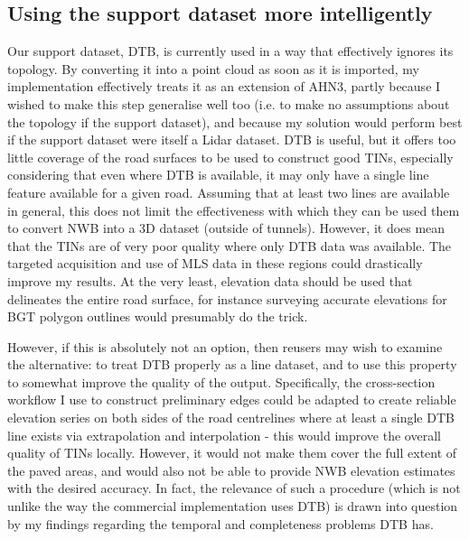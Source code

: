\subsection{Using the support dataset more intelligently}
\label{sub:improvementssupportdataset}

Our support dataset, DTB, is currently used in a way that effectively ignores its topology. By converting it into a point cloud as soon as it is imported, my implementation effectively treats it as an extension of AHN3, partly because I wished to make this step generalise well too (i.e. to make no assumptions about the topology if the support dataset), and because my solution would perform best if the support dataset were itself a Lidar dataset. DTB is useful, but it offers too little coverage of the road surfaces to be used to construct good TINs, especially considering that even where DTB is available, it may only have a single line feature available for a given road. Assuming that at least two lines are available in general, this does not limit the effectiveness with which they can be used them to convert NWB into a 3D dataset (outside of tunnels). However, it does mean that the TINs are of very poor quality where only DTB data was available. The targeted acquisition and use of MLS data in these regions could drastically improve my results. At the very least, elevation data should be used that delineates the entire road surface, for instance surveying accurate elevations for BGT polygon outlines would presumably do the trick.

However, if this is absolutely not an option, then reusers may wish to examine the alternative: to treat DTB properly as a line dataset, and to use this property to somewhat improve the quality of the output. Specifically, the cross-section workflow I use to construct preliminary edges could be adapted to create reliable elevation series on both sides of the road centrelines where at least a single DTB line exists via extrapolation and interpolation - this would improve the overall quality of TINs locally. However, it would not make them cover the full extent of the paved areas, and would also not be able to provide NWB elevation estimates with the desired accuracy. In fact, the relevance of such a procedure (which is not unlike the way the commercial implementation uses DTB) is drawn into question by my findings regarding the temporal and completeness problems DTB has.
